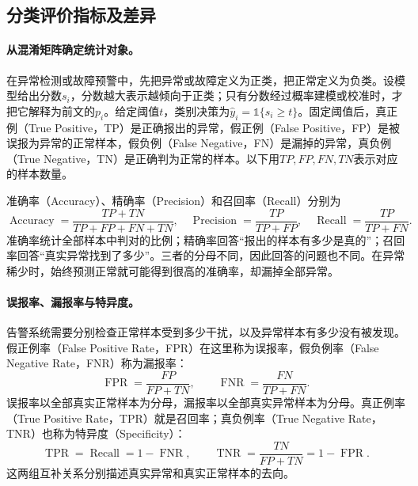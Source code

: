 \subsection{分类评价指标及差异}
\paragraph{从混淆矩阵确定统计对象。}
在异常检测或故障预警中，先把异常或故障定义为正类，把正常定义为负类。设模型给出分数$s_i$，分数越大表示越倾向于正类；只有分数经过概率建模或校准时，才把它解释为前文的$p_i$。给定阈值$t$，类别决策为$\hat y_i=\mathbb 1\{s_i\geq t\}$。固定阈值后，真正例（True Positive，TP）是正确报出的异常，假正例（False Positive，FP）是被误报为异常的正常样本，假负例（False Negative，FN）是漏掉的异常，真负例（True Negative，TN）是正确判为正常的样本。以下用$TP,FP,FN,TN$表示对应的样本数量。

准确率（Accuracy）、精确率（Precision）和召回率（Recall）分别为
\begin{equation}
 \operatorname{Accuracy}=\frac{TP+TN}{TP+FP+FN+TN},\quad
 \operatorname{Precision}=\frac{TP}{TP+FP},\quad
 \operatorname{Recall}=\frac{TP}{TP+FN}.
 \label{eq:classification-basic-metrics}
\end{equation}
准确率统计全部样本中判对的比例；精确率回答“报出的样本有多少是真的”；召回率回答“真实异常找到了多少”。三者的分母不同，因此回答的问题也不同。在异常稀少时，始终预测正常就可能得到很高的准确率，却漏掉全部异常。

\paragraph{误报率、漏报率与特异度。}
告警系统需要分别检查正常样本受到多少干扰，以及异常样本有多少没有被发现。假正例率（False Positive Rate，FPR）在这里称为误报率，假负例率（False Negative Rate，FNR）称为漏报率：
\begin{equation}
 \operatorname{FPR}=\frac{FP}{FP+TN},\qquad
 \operatorname{FNR}=\frac{FN}{TP+FN}.
 \label{eq:classification-fpr-fnr}
\end{equation}
误报率以全部真实正常样本为分母，漏报率以全部真实异常样本为分母。真正例率（True Positive Rate，TPR）就是召回率；真负例率（True Negative Rate，TNR）也称为特异度（Specificity）：
\begin{equation}
 \operatorname{TPR}=\operatorname{Recall}=1-\operatorname{FNR},\qquad
 \operatorname{TNR}=\frac{TN}{FP+TN}=1-\operatorname{FPR}.
 \label{eq:classification-tpr-tnr}
\end{equation}
这两组互补关系分别描述真实异常和真实正常样本的去向。


